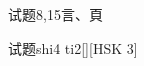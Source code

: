 \begin{entry}{试题}{8,15}{⾔、⾴}
  \begin{phonetics}{试题}{shi4 ti2}[][HSK 3]
  \end{phonetics}
\end{entry}
